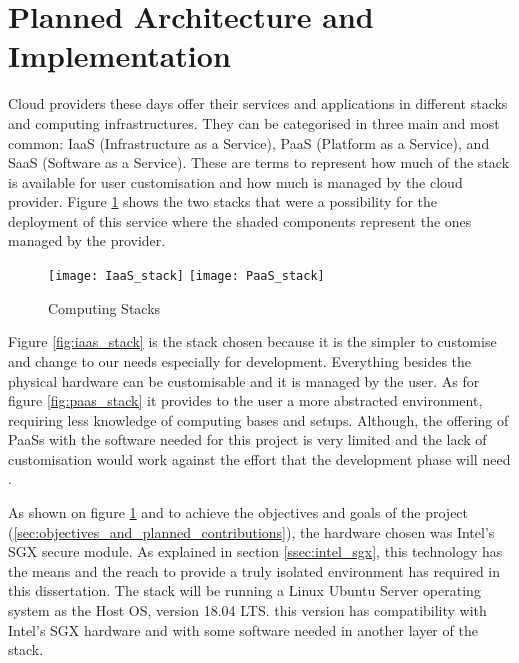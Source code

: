 \section{Planned Architecture and Implementation} %
\label{sec:planned_architecture_and_implementation}

Cloud providers these days offer their services and applications in different stacks and computing infrastructures. They can be categorised in three main and most common: \gls{IaaS} (Infrastructure as a Service), \gls{PaaS} (Platform as a Service), and \gls{SaaS} (Software as a Service). These are terms to represent how much of the stack is available for user customisation and how much is managed by the cloud provider. Figure \ref{fig:computing_stacks} shows the two stacks that were a possibility for the deployment of this service where the shaded components represent the ones managed by the provider.

\begin{figure}[htbp]
  \centering
    {\texttt{[image: IaaS\_stack]}}%
    \hspace{5em}
    {\texttt{[image: PaaS\_stack]}}%
  \caption{Computing Stacks}
  \label{fig:computing_stacks}
\end{figure}

Figure \ref{fig:iaas_stack} is the stack chosen because it is the simpler to customise and change to our needs especially for development. Everything besides the physical hardware can be customisable and it is managed by the user. As for figure \ref{fig:paas_stack} it provides to the user a more abstracted environment, requiring less knowledge of computing bases and setups. Although, the offering of \glspl{PaaS} with the software needed for this project is very limited and the lack of customisation would work against the effort that the development phase will need \cite{computing_stacks:1}.

As shown on figure \ref{fig:computing_stacks} and to achieve the objectives and goals of the project (\ref{sec:objectives_and_planned_contributions}), the hardware chosen was Intel's \gls{SGX} secure module. As explained in section \ref{ssec:intel_sgx}, this technology has the means and the reach to provide a truly isolated environment has required in this dissertation. The stack will be running a Linux Ubuntu Server \cite{ubuntu_server:1} operating system as the Host \gls{OS}, version 18.04 LTS. this version has compatibility with Intel's \gls{SGX} hardware and with some software needed in another layer of the stack.

